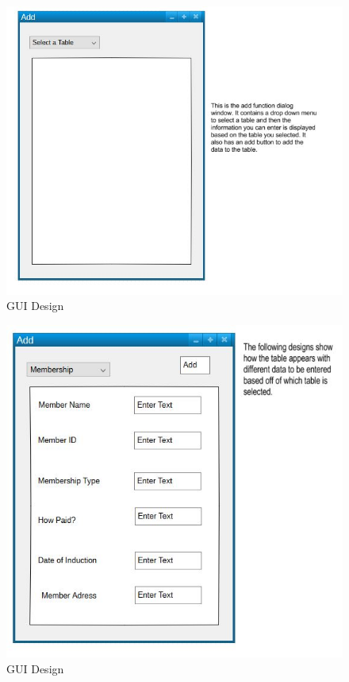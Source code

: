 \begin{figure}[H]
    \includegraphics[width=\textwidth]{Gui_2.JPG}
    \caption{GUI Design} \label{fig:GUI Designs}
\end{figure}

\begin{figure}[H]
    \includegraphics[width=\textwidth]{Gui_3.JPG}
    \caption{GUI Design} \label{fig:GUI Designs}
\end{figure}

